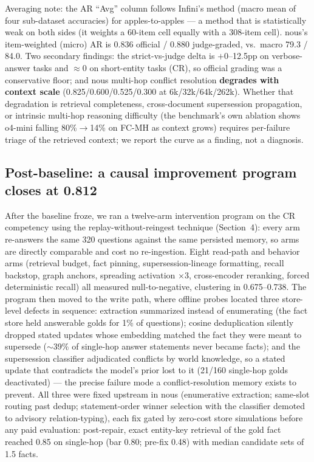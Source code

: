\documentclass{article}
\newcommand{\nous}{\textsf{nous}}
\begin{document}
Averaging note: the AR ``Avg'' column follows Infini's method (macro mean of
four sub-dataset accuracies) for apples-to-apples --- a method that is
statistically weak on both sides (it weights a 60-item cell equally with a
308-item cell). \nous{}'s item-weighted (micro) AR is 0.836 official / 0.880
judge-graded, vs.\ macro 79.3 / 84.0. Two secondary findings: the
strict-vs-judge delta is $+$0--12.5pp on verbose-answer tasks and
$\approx$0 on short-entity tasks (CR), so official grading was a
conservative floor; and \nous{} multi-hop conflict resolution
\textbf{degrades with context scale} (0.825/0.600/0.525/0.300 at
6k/32k/64k/262k). Whether that degradation is retrieval completeness,
cross-document supersession propagation, or intrinsic multi-hop reasoning
difficulty (the benchmark's own ablation shows o4-mini falling
80\%$\to$14\% on FC-MH as context grows) requires per-failure triage of the
retrieved context; we report the curve as a finding, not a diagnosis.

\subsection{Post-baseline: a causal improvement program closes at 0.812}
\label{sec:postbaseline}

After the baseline froze, we ran a twelve-arm intervention program on the CR
competency using the replay-without-reingest technique (Section~4): every arm
re-answers the same 320 questions against the same persisted memory, so arms
are directly comparable and cost no re-ingestion. Eight read-path and
behavior arms (retrieval budget, fact pinning, supersession-lineage
formatting, recall backstop, graph anchors, spreading activation $\times$3,
cross-encoder reranking, forced deterministic recall) all measured
null-to-negative, clustering in 0.675--0.738. The program then moved to the
write path, where offline probes located three store-level defects in
sequence: extraction summarized instead of enumerating (the fact store held
answerable golds for 1\% of questions); cosine deduplication silently
dropped stated updates whose embedding matched the fact they were meant to
supersede ($\sim$39\% of single-hop answer statements never became facts);
and the supersession classifier adjudicated conflicts by world knowledge, so
a stated update that contradicts the model's prior lost to it (21/160
single-hop golds deactivated) --- the precise failure mode a
conflict-resolution memory exists to prevent. All three were fixed upstream
in \nous{} (enumerative extraction; same-slot routing past dedup;
statement-order winner selection with the classifier demoted to advisory
relation-typing), each fix gated by zero-cost store simulations before any
paid evaluation: post-repair, exact entity-key retrieval of the gold fact
reached 0.85 on single-hop (bar 0.80; pre-fix 0.48) with median candidate
sets of 1.5 facts.
\end{document}
